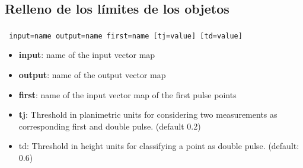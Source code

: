 \subsection{Relleno de los límites de los objetos}
\begin{frame}[shrink=03]
 \frametitle{}
\begin{beamerboxesrounded}[shadow=true]{\textbf{}\texttt{ input=name output=name first=name [tj=value] [td=value]}}
\begin{itemize}
 \item \textbf{input}: name of the input vector map
 \item \textbf{output}: name of the output vector map
 \item \textbf{first}: name of the input vector map of the first pulse points
 \item \textbf{tj}: Threshold in planimetric units for considering two measurements as corresponding first and double pulse. (default
0.2)
 \item td: Threshold in height units for classifying a point as double pulse. (default: 0.6)
\end{itemize}
\end{beamerboxesrounded}
\vgrow
\end{frame}
\pgfdeclareimage[width=0.45\textwidth]{grow}{images/grow}
